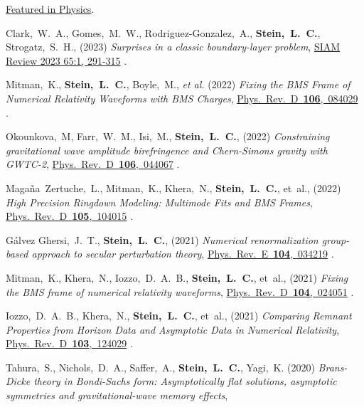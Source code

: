 \begin{etaremune}[start=\value{pubCounter}]
  \href{https://physics.aps.org/articles/v16/29}{Featured in Physics}.
\item
  Clark,~W.~A.,
  Gomes,~M.~W.,
  Rodriguez-Gonzalez,~A.,
  {\bf Stein,~L.~C.},
  Strogatz,~S.~H.,
  (2023)
  {\it Surprises in a classic boundary-layer problem},
  \href{https://doi.org/10.1137/21M1436087}%
  {SIAM Review 2023 65:1, 291-315}
  .
\item
  Mitman,~K.,
  {\bf Stein,~L.~C.},
  Boyle,~M., {\it et al.}
  (2022)
  {\it Fixing the BMS Frame of Numerical Relativity Waveforms with BMS Charges},
  \href{https://doi.org/10.1103/PhysRevD.106.084029}%
  {Phys.~Rev.~D~{\bf 106},~084029}
  .
\item
  Okounkova,~M,
  Farr,~W.~M.,
  Isi,~M.,
  {\bf Stein,~L.~C.},
  (2022)
  {\it Constraining gravitational wave amplitude birefringence and Chern-Simons gravity with GWTC-2},
  \href{https://doi.org/10.1103/PhysRevD.106.044067}%
  {Phys.~Rev.~D~{\bf 106},~044067}
  .
\item
  Magaña~Zertuche,~L.,
  Mitman,~K.,
  Khera,~N.,
  {\bf Stein,~L.~C.},
  et~al.,
  (2022)
  {\it High Precision Ringdown Modeling: Multimode Fits and BMS Frames},
  \href{https://doi.org/10.1103/PhysRevD.105.104015}%
  {Phys.~Rev.~D~{\bf 105},~104015}
  .
\item
  Gálvez Ghersi,~J.~T.,
  {\bf Stein,~L.~C.},
  (2021)
  {\it Numerical renormalization group-based approach to secular perturbation theory},
  \href{https://doi.org/10.1103/PhysRevE.104.034219}%
  {Phys.~Rev.~E~{\bf 104},~034219}
  .
\item
  Mitman,~K.,
  Khera,~N.,
  Iozzo,~D.~A.~B.,
  {\bf Stein,~L.~C.},
  et~al.,
  (2021)
  {\it Fixing the BMS frame of numerical relativity waveforms},
  \href{https://doi.org/10.1103/PhysRevD.104.024051}%
  {Phys.~Rev.~D~{\bf 104},~024051}
  .
\item
  Iozzo,~D.~A.~B.,
  Khera,~N.,
  {\bf Stein,~L.~C.},
  et~al.,
  (2021)
  {\it Comparing Remnant Properties from Horizon Data and Asymptotic Data in Numerical Relativity},
  \href{https://doi.org/10.1103/PhysRevD.103.124029}%
  {Phys.~Rev.~D~{\bf 103},~124029}
  .
\item
  Tahura,~S.,
  Nichols,~D.~A.,
  Saffer,~A.,
  {\bf Stein,~L.~C.},
  Yagi,~K.
  (2020)
  {\it Brans-Dicke theory in Bondi-Sachs form: Asymptotically flat solutions, asymptotic symmetries and gravitational-wave memory effects},

\end{etaremune}
